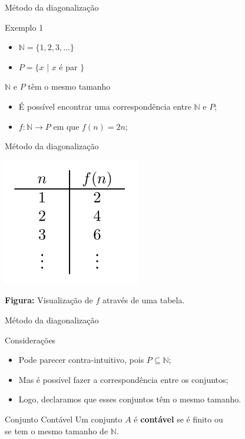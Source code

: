 \documentclass[xcolor=dvipsnames,table]{beamer}
\begin{document}
	\begin{frame}{Método da diagonalização}
		\begin{block}{Exemplo 1}
			\begin{itemize}
				\item $\mathbb{N} = \{ 1, 2, 3, ... \}$
				\item $P = \{ x$ | $x$ é par $\}$
			\end{itemize} 
		\end{block}  
		\begin{block}{$\mathbb{N}$ e $P$ têm o mesmo tamanho}  
			\begin{itemize}
				\item É possível encontrar uma correspondência entre $\mathbb{N}$ e $P$;  
				\item $f:\mathbb{N} \rightarrow P$ em que $f(n) = 2n$;
			\end{itemize}
		\end{block}	
	\end{frame}
	
	\begin{frame}{Método da diagonalização}
		\begin{center}
			\includegraphics[width=6cm]{images/fn2n.png}
			
			{\bf Figura:} Visualização de $f$ através de uma tabela.
		\end{center}
	\end{frame}
	
	\begin{frame}{Método da diagonalização}
		\begin{block}{Considerações}
			\begin{itemize}
				\item Pode parecer contra-intuitivo, pois $P \subseteq \mathbb{N}$;  
				\item Mas é possível fazer a correspondência entre os conjuntos;  
				\item Logo, declaramos que esses conjuntos têm o mesmo tamanho.			
			\end{itemize}
		\end{block}  
		\begin{block}{Conjunto Contável}
			Um conjunto $A$ é {\bf contável} se é finito ou \\se tem o mesmo tamanho de $\mathbb{N}$.
		\end{block}
	\end{frame}
	
\end{document}
